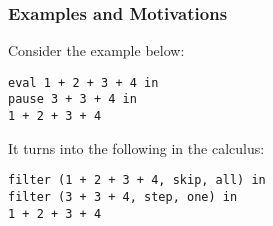 
\subsubsection{Examples and Motivations}

Consider the example below:
\lstset{xleftmargin=1in}
\begin{lstlisting}[language=hazel]
eval 1 + 2 + 3 + 4 in
pause 3 + 3 + 4 in
1 + 2 + 3 + 4
\end{lstlisting}

It turns into the following in the calculus:
\begin{lstlisting}[language=hazel]
filter (1 + 2 + 3 + 4, skip, all) in
filter (3 + 3 + 4, step, one) in
1 + 2 + 3 + 4
\end{lstlisting}

